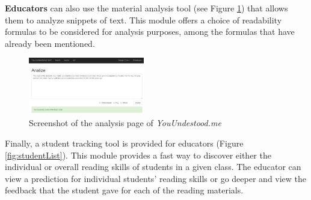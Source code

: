 \documentclass{sig-alternate-05-2015}
\begin{document}
\textbf{Educators} can also use the material analysis tool (see Figure \ref{fig:analysispage}) that allows them to analyze snippets of text. This module offers a choice of readability formulas to be considered for analysis purposes, among the formulas that have already been mentioned.


\begin{figure}[h!]
 \centering
  \includegraphics[width=0.45\textwidth]{creatingFigures/Capture22}
 \caption{Screenshot of the analysis page of \textit{YouUndestood.me}}
 \label{fig:analysispage}
 \end{figure}
 
 
 
Finally, a student tracking tool is provided for educators (Figure \ref{fig:studentList}). This module provides a fast way to discover either the individual or overall reading skills of students in a given class. The educator can view a prediction for individual students' reading skills or go deeper and view the feedback that the student gave for each of the reading materials.


%

\end{document}
